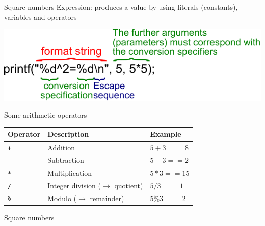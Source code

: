 \documentclass[usenames,dvipsnames,aspectratio=169]{beamer}
\begin{document}
\begin{frame}{Square numbers}
  Expression: produces a value by using literals (constants), variables and operators
  \begin{center}
    \includegraphics[scale=.9]{printf2.pdf}
  \end{center}
  Some arithmetic operators\\
  \begin{center}
    \begin{tabular}{lll}
      Operator & Description & Example\\ \hline
      \texttt{+} & Addition & $5 + 3 == 8$ \\
      \texttt{-} & Subtraction & $5 - 3 == 2$ \\
      \texttt{*} & Multiplication & $5 * 3 == 15$ \\
      \texttt{/} & Integer division ($\to$ quotient) & $5 / 3 == 1$ \\
      \texttt{\%} & Modulo ($\to$ remainder) & $5 \% 3 == 2$ \\
    \end{tabular}
  \end{center}
\end{frame}

\begin{frame}{Square numbers}
  \footnotesize
  \begin{exampleblock}{}
    \vspace{-0.3cm}
    
    
    \vspace{-0.3cm}
  \end{exampleblock}
\end{frame}
\end{document}
